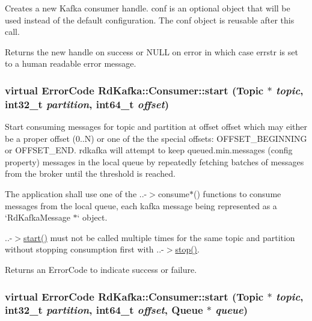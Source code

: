 Creates a new Kafka consumer handle. {\ttfamily conf} is an optional object that will be used instead of the default configuration. The {\ttfamily conf} object is reusable after this call.

\begin{DoxyReturn}{Returns}
the new handle on success or NULL on error in which case {\ttfamily errstr} is set to a human readable error message. 
\end{DoxyReturn}
\hypertarget{classRdKafka_1_1Consumer_ad2044e3433f626baff667e1a429d6f33}{
\subsubsection[{start}]{\setlength{\rightskip}{0pt plus 5cm}virtual ErrorCode RdKafka::Consumer::start ({\bf Topic} $\ast$ {\em topic}, \/  int32\_\-t {\em partition}, \/  int64\_\-t {\em offset})}}
\label{classRdKafka_1_1Consumer_ad2044e3433f626baff667e1a429d6f33}


Start consuming messages for topic and {\ttfamily partition} at offset {\ttfamily offset} which may either be a proper offset (0..N) or one of the the special offsets: {\ttfamily OFFSET\_\-BEGINNING} or {\ttfamily OFFSET\_\-END}. rdkafka will attempt to keep {\ttfamily queued.min.messages} (config property) messages in the local queue by repeatedly fetching batches of messages from the broker until the threshold is reached.

The application shall use one of the {\ttfamily }..-\/$>$consume$\ast$() functions to consume messages from the local queue, each kafka message being represented as a `RdKafkaMessage $\ast$` object.

{\ttfamily }..-\/$>$\hyperlink{classRdKafka_1_1Consumer_ad2044e3433f626baff667e1a429d6f33}{start()} must not be called multiple times for the same topic and partition without stopping consumption first with {\ttfamily }..-\/$>$\hyperlink{classRdKafka_1_1Consumer_a123ce138ca526ee1e5fafff09f14602b}{stop()}.

\begin{DoxyReturn}{Returns}
an ErrorCode to indicate success or failure. 
\end{DoxyReturn}
\hypertarget{classRdKafka_1_1Consumer_a096b4f201fef44fe4607a9b0b907a229}{
\subsubsection[{start}]{\setlength{\rightskip}{0pt plus 5cm}virtual ErrorCode RdKafka::Consumer::start ({\bf Topic} $\ast$ {\em topic}, \/  int32\_\-t {\em partition}, \/  int64\_\-t {\em offset}, \/  {\bf Queue} $\ast$ {\em queue})}}
\label{classRdKafka_1_1Consumer_a096b4f201fef44fe4607a9b0b907a229}


